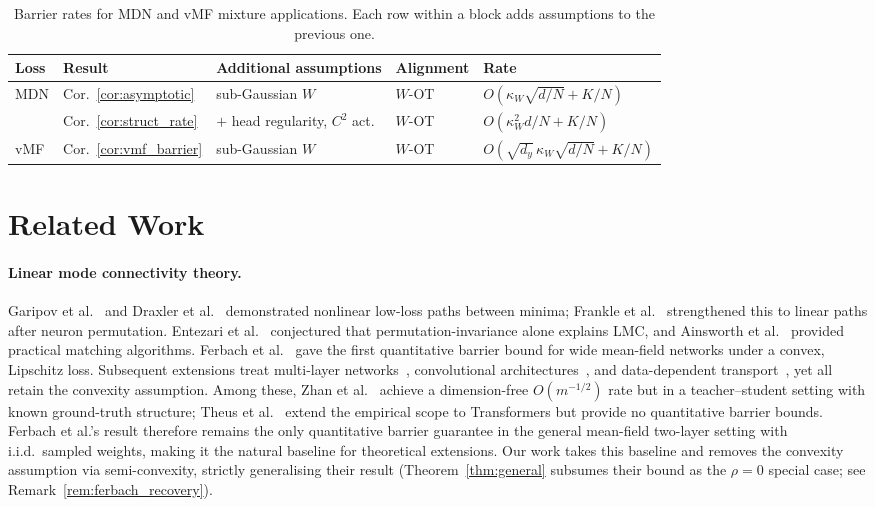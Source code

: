 \documentclass[11pt]{article}
\begin{document}
\begin{table}[t]
\centering\small
\caption{Barrier rates for MDN and vMF mixture applications.
  Each row within a block adds assumptions to the previous one.}
\label{tab:refinement}
\begin{tabular}{@{}lllll@{}}
\toprule
\textbf{Loss} & \textbf{Result} & \textbf{Additional assumptions}
  & \textbf{Alignment} & \textbf{Rate} \\
\midrule
\multirow{2}{*}{MDN}
  & Cor.~\ref{cor:asymptotic}
  & sub-Gaussian $W$
  & $W$-OT
  & $O(\kappa_W\sqrt{d/N} + K/N)$ \\
  & Cor.~\ref{cor:struct_rate}
  & $+$ head regularity, $C^2$ act.
  & $W$-OT
  & $O(\kappa_W^2 d/N + K/N)$ \\
\midrule
vMF
  & Cor.~\ref{cor:vmf_barrier}
  & sub-Gaussian $W$
  & $W$-OT
  & $O(\sqrt{d_y}\,\kappa_W\sqrt{d/N} + K/N)$ \\
\bottomrule
\end{tabular}
\end{table}

\section{Related Work}\label{sec:related}

\paragraph{Linear mode connectivity theory.}
Garipov et al.~\cite{garipov2018} and Draxler et al.~\cite{draxler2018}
demonstrated nonlinear low-loss paths between minima;
Frankle et al.~\cite{frankle2020} strengthened this to linear paths
after neuron permutation.
Entezari et al.~\cite{entezari2022} conjectured that
permutation-invariance alone explains LMC, and
Ainsworth et al.~\cite{ainsworth2023} provided practical matching
algorithms.
Ferbach et al.~\cite{ferbach2024} gave the first quantitative barrier
bound for wide mean-field networks under a convex, Lipschitz loss.
Subsequent extensions treat multi-layer
networks~\cite{zhan2025permutation}, convolutional
architectures~\cite{theus2025}, and data-dependent
transport~\cite{kanoh2025dte}, yet all retain the convexity assumption.
Among these, Zhan et al.~\cite{zhan2025permutation} achieve a
dimension-free $O(m^{-1/2})$ rate but in a teacher--student setting
with known ground-truth structure;
Theus et al.~\cite{theus2025} extend the empirical scope to
Transformers but provide no quantitative barrier bounds.
Ferbach et al.'s result therefore remains the only quantitative
barrier guarantee in the general mean-field two-layer setting
with i.i.d.\ sampled weights, making it the natural baseline
for theoretical extensions.
Our work takes this baseline and removes the convexity
assumption via semi-convexity, strictly generalising their
result (Theorem~\ref{thm:general} subsumes their bound as
the $\rho=0$ special case;
see Remark~\ref{rem:ferbach_recovery}).
\end{document}

